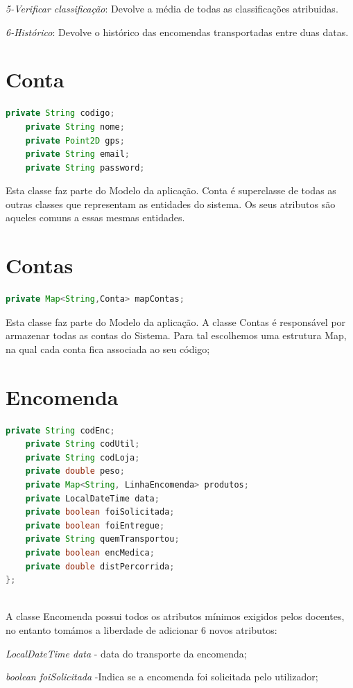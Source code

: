 \documentclass[a4paper]{report}
\begin{document}
	\textit{5-Verificar classificação}: Devolve a média de todas as classificações atribuidas.
	 
	 \textit{6-Histórico}: Devolve o histórico das encomendas transportadas entre duas datas.
	
	\section{Conta}
	\begin{lstlisting}[language=Java]
	private String codigo;
	private String nome;
	private Point2D gps;
	private String email;
	private String password;
	\end{lstlisting}
	Esta classe faz parte do Modelo da aplicação. Conta é superclasse de todas as outras classes que representam as entidades do sistema. Os seus atributos são aqueles comuns a essas mesmas entidades.
	
	\section{Contas}
	\begin{lstlisting}[language=Java]
	private Map<String,Conta> mapContas;
	\end{lstlisting}
	Esta classe faz parte do Modelo da aplicação. A classe Contas é responsável por armazenar todas as contas do Sistema. Para tal escolhemos uma estrutura Map, na qual cada conta fica associada ao seu código;
	
	
	
	\section{Encomenda}
	\begin{lstlisting}[language=Java]
	private String codEnc;
	private String codUtil;
	private String codLoja;
	private double peso;
	private Map<String, LinhaEncomenda> produtos;
	private LocalDateTime data;
	private boolean foiSolicitada;
	private boolean foiEntregue;
	private String quemTransportou;
	private boolean encMedica;
	private double distPercorrida;
};
   
	\end{lstlisting}
	A classe Encomenda possui todos os atributos mínimos exigidos pelos docentes, no entanto tomámos a liberdade de adicionar 6 novos atributos:
	
	  \textit{LocalDateTime data} - data do transporte da encomenda;
	  	
	  \textit{boolean foiSolicitada} -Indica se a encomenda foi solicitada pelo utilizador;
	  
\end{document}
